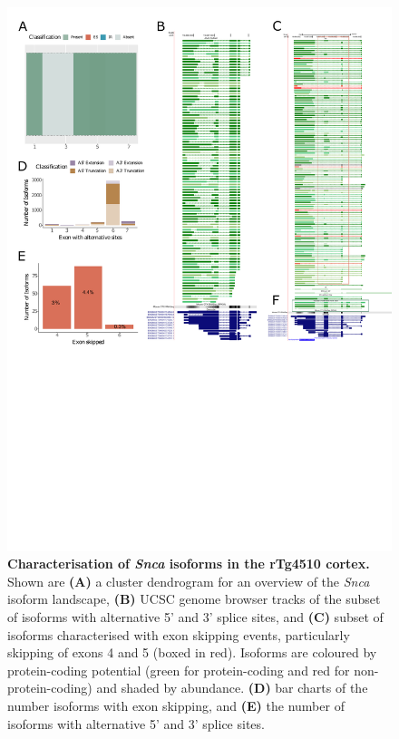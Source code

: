 \begin{figure}[htp]
	\centering
	\includegraphics[page=7,trim={0 10cm 0 0},scale = 0.85]{Figures/TargetGenes_Annotation_Portrait.pdf}
	\captionsetup{width=0.95\textwidth}
	\caption[Characterisation of the \textit{Snca} isoform landscape]%
	{\textbf{Characterisation of \textit{Snca} isoforms in the rTg4510 cortex.} Shown are \textbf{(A)} a cluster dendrogram for an overview of the \textit{Snca} isoform landscape, \textbf{(B)} UCSC genome browser tracks of the subset of isoforms with alternative 5' and 3' splice sites, and \textbf{(C)} subset of isoforms characterised with exon skipping events, particularly skipping of exons 4 and 5 (boxed in red). Isoforms are coloured by protein-coding potential (green for protein-coding and red for non-protein-coding) and shaded by abundance. \textbf{(D)} bar charts of the number isoforms with exon skipping, and \textbf{(E)} the number of isoforms with alternative 5' and 3' splice sites.}    
	\label{fig:snca}
\end{figure}
\restoregeometry


